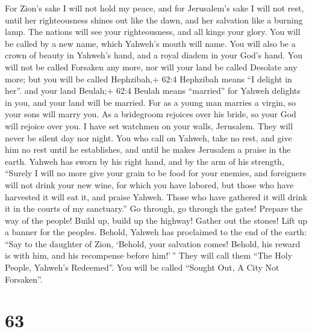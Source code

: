  For Zion's sake I will not hold my peace, and for
Jerusalem's sake I will not rest, until her righteousness shines out
like the dawn, and her salvation like a burning lamp.  The
nations will see your righteousness, and all kings your glory. You will
be called by a new name, which Yahweh's mouth will name. 
You will also be a crown of beauty in Yahweh's hand, and a royal diadem
in your God's hand.  You will not be called Forsaken any
more, nor will your land be called Desolate any more; but you will be
called Hephzibah,+ 62:4 Hephzibah means ``I delight in her''. and your
land Beulah;+ 62:4 Beulah means ``married'' for Yahweh delights in you,
and your land will be married.  For as a young man marries a
virgin, so your sons will marry you. As a bridegroom rejoices over his
bride, so your God will rejoice over you.  I have set
watchmen on your walls, Jerusalem. They will never be silent day nor
night. You who call on Yahweh, take no rest,  and give him
no rest until he establishes, and until he makes Jerusalem a praise in
the earth.  Yahweh has sworn by his right hand, and by the
arm of his strength, ``Surely I will no more give your grain to be food
for your enemies, and foreigners will not drink your new wine, for which
you have labored,  but those who have harvested it will eat
it, and praise Yahweh. Those who have gathered it will drink it in the
courts of my sanctuary.''  Go through, go through the
gates! Prepare the way of the people! Build up, build up the highway!
Gather out the stones! Lift up a banner for the peoples. 
Behold, Yahweh has proclaimed to the end of the earth: ``Say to the
daughter of Zion, `Behold, your salvation comes! Behold, his reward is
with him, and his recompense before him!'\,''  They will
call them ``The Holy People, Yahweh's Redeemed''. You will be called
``Sought Out, A City Not Forsaken''.

\hypertarget{section-59}{%
\section{63}\label{section-59}}

